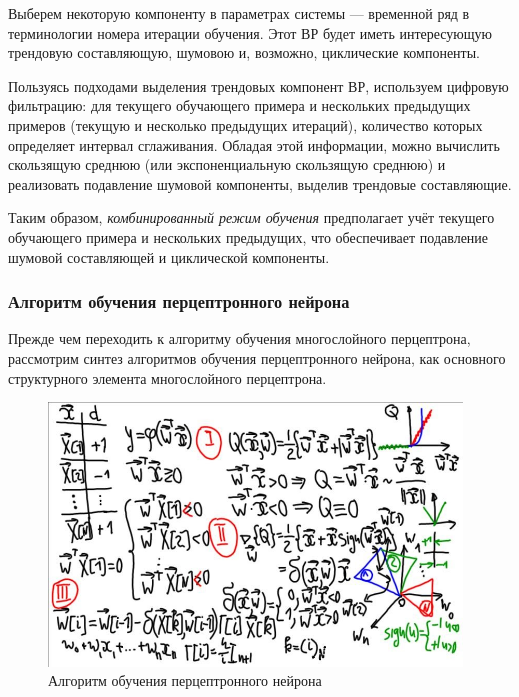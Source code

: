 \documentclass{article}
\numberwithin{equation}{subsection}
\begin{document}
Выберем некоторую компоненту в параметрах системы --- временной ряд в терминологии
номера итерации обучения. Этот ВР будет иметь интересующую трендовую составляющую,
шумовою и, возможно, циклические компоненты.

Пользуясь подходами выделения трендовых компонент ВР, используем цифровую фильтрацию:
для текущего обучающего примера и нескольких предыдущих примеров (текущую и несколько
предыдущих итераций), количество которых определяет интервал сглаживания.
Обладая этой информации, можно вычислить скользящую среднюю (или экспоненциальную 
скользящую среднюю) и реализовать подавление шумовой компоненты, выделив 
трендовые составляющие.

Таким образом, \textit{комбинированный режим обучения} предполагает учёт текущего
обучающего примера и нескольких предыдущих, что обеспечивает подавление шумовой 
составляющей и циклической компоненты.




\subsubsection{Алгоритм обучения перцептронного нейрона}

Прежде чем переходить к алгоритму обучения многослойного перцептрона, рассмотрим
синтез алгоритмов обучения перцептронного нейрона, как основного структурного
элемента многослойного перцептрона.

\begin{figure}[htbp]
    \centering
    \includegraphics[height=7cm]{hyperflat_6_1.jpeg}
    \caption{Алгоритм обучения перцептронного нейрона}
    \label{hyperflat_6_1}
\end{figure}

\end{document}
